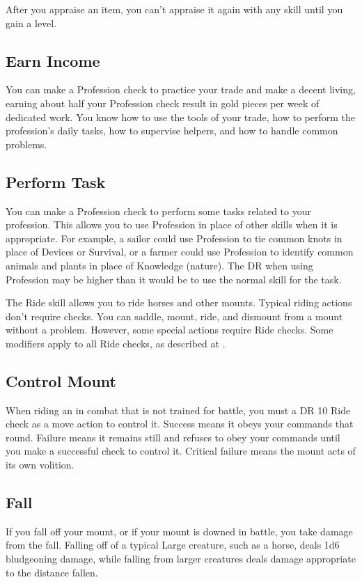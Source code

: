         After you appraise an item, you can't appraise it again with any skill until you gain a level.

    \subsection{Earn Income}
        You can make a Profession check to practice your trade and make a decent living, earning about half your Profession check result in gold pieces per week of dedicated work. You know how to use the tools of your trade, how to perform the profession's daily tasks, how to supervise helpers, and how to handle common problems.

    \subsection{Perform Task}
        You can make a Profession check to perform some tasks related to your profession. This allows you to use Profession in place of other skills when it is appropriate. For example, a sailor could use Profession to tie common knots in place of Devices or Survival, or a farmer could use Profession to identify common animals and plants in place of Knowledge (nature). The DR when using Profession may be higher than it would be to use the normal skill for the task.

\newpage
{}
        The Ride skill allows you to ride horses and other mounts. Typical riding actions don't require checks. You can saddle, mount, ride, and dismount from a mount without a problem. However, some special actions require Ride checks. Some modifiers apply to all Ride checks, as described at .

    \subsection{Control Mount}
        When riding an  in combat that is not trained for battle, you must a DR 10 Ride check as a move action to control it. Success means it obeys your commands that round. Failure means it remains still and refuses to obey your commands until you make a successful check to control it. Critical failure means the mount acts of its own volition.

    \subsection{Fall}
        If you fall off your mount, or if your mount is downed in battle, you take damage from the fall.
        Falling off of a typical Large creature, such as a horse, deals 1d6 bludgeoning damage, while falling from larger creatures deals damage appropriate to the distance fallen.

